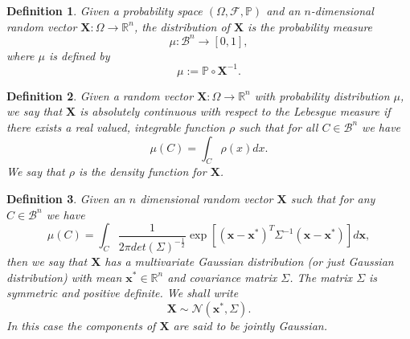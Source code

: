 \documentclass{sfuthesis}
\newtheorem{definition}{Definition}
\newcommand{\p}{\mathbb{P}}
\begin{document}
\begin{definition}
Given a probability space $(\Omega,\mathscr{F},\p)$ and an $n$-dimensional  random vector 
$\mathbf{X}:\Omega\rightarrow\mathbb{R}^{n}$, the distribution of $\mathbf{X}$
is the probability measure
\begin{equation*}
\mu:\mathcal{B}^{n}\rightarrow [0,1],
\end{equation*}
where  $\mu$ is defined by 
\begin{equation*}
\mu:=\p\circ \textbf{X}^{-1}.
\end{equation*}
\end{definition}
\begin{definition}
Given a random vector $\textbf{X}:\Omega\rightarrow\mathbb{R}^{n}$ with
probability distribution $\mu$, we say that $\mathbf{X}$ is absolutely 
continuous with respect to the Lebesgue measure if there exists a real valued, integrable function $\rho$
such that for all $C\in\mathcal{B}^{n}$ we have
\begin{equation*}
\mu(C)=\int_{C}\rho(x)dx.
\end{equation*}
We say that $\rho$ is the density function for $\mathbf{X}$.
\end{definition}
\begin{definition}\label{dfnrandonvariables}
Given an $n$ dimensional random vector $\mathbf{X}$ such that for any 
$C\in\mathcal{B}^{n}$ we have
\begin{equation}\label{eqnmultivariateGaussianDefinition}
\mu(C)=\int_{C}
\frac{1}{2\pi det(\Sigma)^{-\frac{1}{2}}}\exp\left[(\textbf{x}-\textbf{x}^{*})^{T}\Sigma^{-1}
(\textbf{x}-\textbf{x}^{*})\right]d\textbf{x},
\end{equation}
then we say
that $\textbf{X}$ has a multivariate Gaussian distribution (or just Gaussian distribution) 
with mean $\textbf{x}^{*}\in\mathbb{R}^{n}$
and covariance matrix $\Sigma$. The matrix $\Sigma$ is symmetric and positive definite. We shall write
\begin{equation}\label{eqnMultivariate}
\textbf{X}\sim \mathcal{N}(\textbf{x}^{*},\Sigma).
\end{equation}
In this case the components of $\textbf{X}$ are said to be \textit{jointly Gaussian}.
\end{definition}
\end{document}
